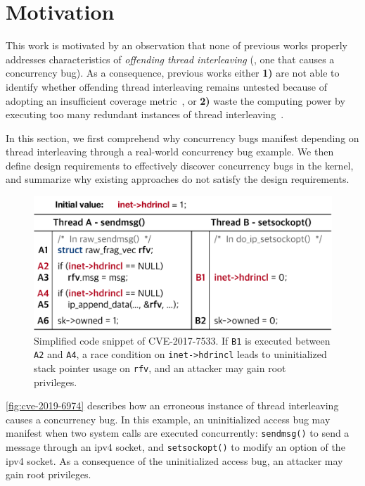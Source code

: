 \section{Motivation}
\label{s:motivation}



%
This work is motivated by an observation that none of previous works
properly addresses characteristics of \textit{offending thread
  interleaving} (\ie, one that causes a concurrency bug).
%
As a consequence, previous works either \textbf{1)} are not able to
identify whether offending thread interleaving remains untested
because of adopting an insufficient coverage metric~\cite{krace}, or
\textbf{2)} waste the computing power by executing too many redundant
instances of thread interleaving~\cite{snowboard, razzer}.


In this section, we first comprehend why concurrency bugs manifest
depending on thread interleaving through a real-world concurrency bug
example.
%
We then define design requirements to effectively discover concurrency
bugs in the kernel, and summarize why existing approaches do not
satisfy the design requirements.


%
\begin{figure}[t]
  \centering
  \includegraphics[width=0.95\linewidth]{fig/cve-2017-10661.pdf}
  \caption{Simplified code snippet of CVE-2017-7533. If \texttt{B1} is
    executed between \texttt{A2} and \texttt{A4}, a race condition on
    \texttt{inet->hdrincl} leads to uninitialized stack pointer usage
    on \texttt{rfv}, and an attacker may gain root privileges.}
  \label{fig:cve-2019-6974}
\end{figure}
%
\autoref{fig:cve-2019-6974} describes how an erroneous instance of
thread interleaving causes a concurrency bug.
%
In this example, an uninitialized access bug may manifest when two
system calls are executed concurrently: \texttt{sendmsg()} to send a
message through an ipv4 socket, and \texttt{setsockopt()} to modify an
option of the ipv4 socket. As a consequence of the uninitialized
access bug, an attacker may gain root privileges.



